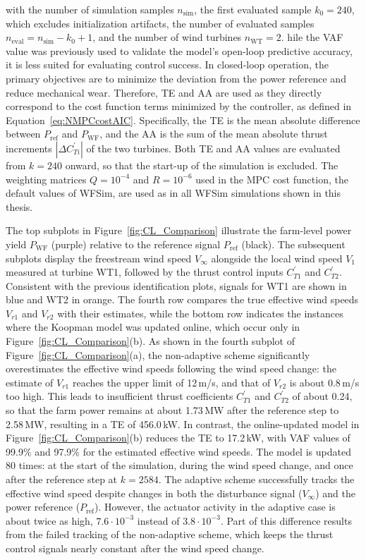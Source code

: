 with the number of simulation samples $n_\text{sim}$, the first evaluated sample $k_0 = 240$, which excludes initialization artifacts, the number of evaluated samples $n_\text{eval} = n_\text{sim} - k_0 + 1$, and the number of wind turbines $n_{\text{WT}} = 2$. hile the VAF value was previously used to validate the model's open-loop predictive accuracy, it is less suited for evaluating control success. In closed-loop operation, the primary objectives are to minimize the deviation from the power reference and reduce mechanical wear. Therefore, TE and AA are used as they directly correspond to the cost function terms minimized by the controller, as defined in Equation~\eqref{eq:NMPCcostAIC}. Specifically, the TE is the mean absolute difference between $P_{\text{ref}}$ and $P_{\text{WF}}$, and the AA is the sum of the mean absolute thrust increments $|\Delta C_{Ti}^\prime|$ of the two turbines. Both TE and AA values are evaluated from $k = 240$ onward, so that the start-up of the simulation is excluded. The weighting matrices $Q = 10^{-4}$ and $R = 10^{-6}$ used in the MPC cost function, the default values of WFSim, are used as in all WFSim simulations shown in this thesis.

The top subplots in Figure~\ref{fig:CL_Comparison} illustrate the farm-level power yield $P_{\text{WF}}$ (purple) relative to the reference signal $P_{\text{ref}}$ (black). The subsequent subplots display the freestream wind speed $V_{\infty}$ alongside the local wind speed $V_1$ measured at turbine WT1, followed by the thrust control inputs $C_{T1}^\prime$ and $C_{T2}^\prime$. Consistent with the previous identification plots, signals for WT1 are shown in blue and WT2 in orange. The fourth row compares the true effective wind speeds $V_{r1}$ and $V_{r2}$ with their estimates, while the bottom row indicates the instances where the Koopman model was updated online, which occur only in Figure~\ref{fig:CL_Comparison}(b). As shown in the fourth subplot of Figure~\ref{fig:CL_Comparison}(a), the non-adaptive scheme significantly overestimates the effective wind speeds following the wind speed change: the estimate of $V_{r1}$ reaches the upper limit of 12\,m/s, and that of $V_{r2}$ is about 0.8\,m/s too high. This leads to insufficient thrust coefficients $C_{T1}^\prime$ and $C_{T2}^\prime$ of about 0.24, so that the farm power remains at about 1.73\,MW after the reference step to 2.58\,MW, resulting in a TE of 456.0\,kW. In contrast, the online-updated model in Figure~\ref{fig:CL_Comparison}(b) reduces the TE to 17.2\,kW, with VAF values of 99.9\% and 97.9\% for the estimated effective wind speeds. The model is updated 80 times: at the start of the simulation, during the wind speed change, and once after the reference step at $k = 2584$. The adaptive scheme successfully tracks the effective wind speed despite changes in both the disturbance signal ($V_{\infty}$) and the power reference ($P_{\text{ref}}$). 
%
However, the actuator activity in the adaptive case is about twice as high, $7.6\cdot 10^{-3}$ instead of $3.8\cdot 10^{-3}$. Part of this difference results from the failed tracking of the non-adaptive scheme, which keeps the thrust control signals nearly constant after the wind speed change.

